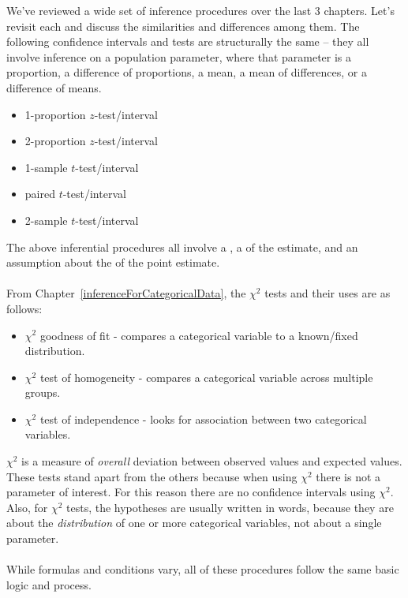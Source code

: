 \noindent We've reviewed a wide set of inference procedures over the last 3 chapters. Let's revisit each and discuss the similarities and differences among them.  The following confidence intervals and tests are structurally the same -- they all involve inference on a population parameter, where that parameter is a proportion, a difference of proportions, a mean, a mean of differences, or a difference of means. \vspace{-1mm}
\begin{itemize}
\setlength{\itemsep}{0mm}
\item 1-proportion $z$-test/interval
\item 2-proportion $z$-test/interval
\item 1-sample $t$-test/interval
\item paired $t$-test/interval
\item 2-sample $t$-test/interval 
\end{itemize}
The above inferential procedures all involve a , a  of the estimate, and an assumption about the  of the point estimate.
\\
\\
From Chapter~\ref{inferenceForCategoricalData}, the $\chi^2$ tests and their uses are as follows:\vspace{-1mm}
\begin{itemize}
\setlength{\itemsep}{0mm}
\item $\chi^2$ goodness of fit - compares a categorical variable to a known/fixed distribution.
\item $\chi^2$ test of homogeneity - compares a categorical variable across multiple groups.
\item $\chi^2$ test of independence - looks for association between two categorical variables. 
\end{itemize}
$\chi^2$ is a measure of \emph{overall} deviation between observed values and expected values.  These tests stand apart from the others because when using $\chi^2$ there is not a parameter of interest.  For this reason there are no confidence intervals using $\chi^2$.  Also, for $\chi^2$ tests, the hypotheses are usually written in words, because they are about the \emph{distribution} of one or more categorical variables, not about a single parameter.  
\\
\\
While formulas and conditions vary, all of these procedures follow the same basic logic and process.
